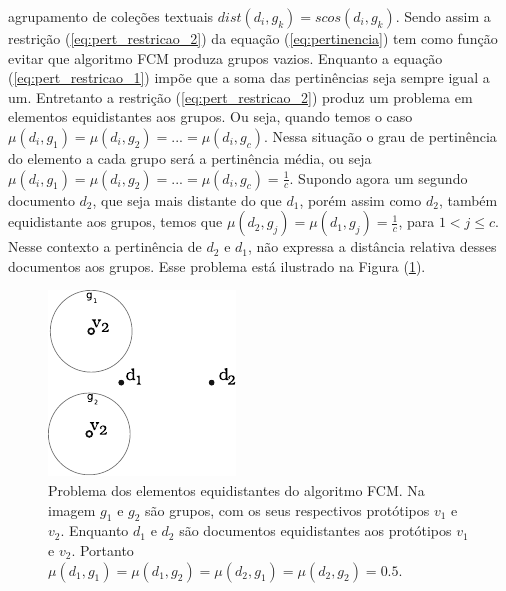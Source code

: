 agrupamento de coleções textuais $dist(d_i,g_k) = scos(d_i,g_k)$.  Sendo assim a restrição
(\ref{eq:pert_restricao_2}) da equação (\ref{eq:pertinencia}) tem como função evitar que algoritmo
FCM produza grupos vazios\cite{Nogueira2013}. Enquanto a equação (\ref{eq:pert_restricao_1}) impõe
que a soma das pertinências seja sempre igual a um.  Entretanto a restrição
(\ref{eq:pert_restricao_2}) produz um problema em elementos equidistantes aos grupos. Ou seja,
quando temos o caso $\mu(d_i, g_1) = \mu(d_i, g_2) = ... = \mu(d_i, g_c)$. Nessa situação o grau de
pertinência do elemento a cada grupo será a pertinência média, ou seja $\mu(d_i, g_1) = \mu(d_i,
g_2) = ... = \mu(d_i, g_c) = \frac{1}{c}$. Supondo agora um segundo documento $d_2$, que seja mais
distante do que $d_1$, porém assim como $d_2$, também equidistante aos grupos, temos que $\mu(d_2,
g_j) = \mu(d_1, g_j) = \frac{1}{c}$, para $1 < j \leq c$. Nesse contexto a pertinência de $d_2$ e
$d_1$, não expressa a distância relativa desses documentos aos grupos. Esse problema está ilustrado
na Figura (\ref{fig:fcm_problem}).

\begin{figure}[!htp] \centering
  \includegraphics[width=0.4\columnwidth]{assets/clusters_fcm_problem.pdf} \caption{Problema dos
    elementos equidistantes do algoritmo FCM. Na imagem $g_1$ e $g_2$ são grupos, com os seus
    respectivos protótipos $v_1$ e $v_2$. Enquanto $d_1$ e $d_2$ são documentos equidistantes aos
    protótipos $v_1$ e $v_2$. Portanto $\mu(d_1,g_1) = \mu(d_1,g_2) = \mu(d_2,g_1) = \mu(d_2,g_2) =
0.5$.} \label{fig:fcm_problem} \end{figure}

